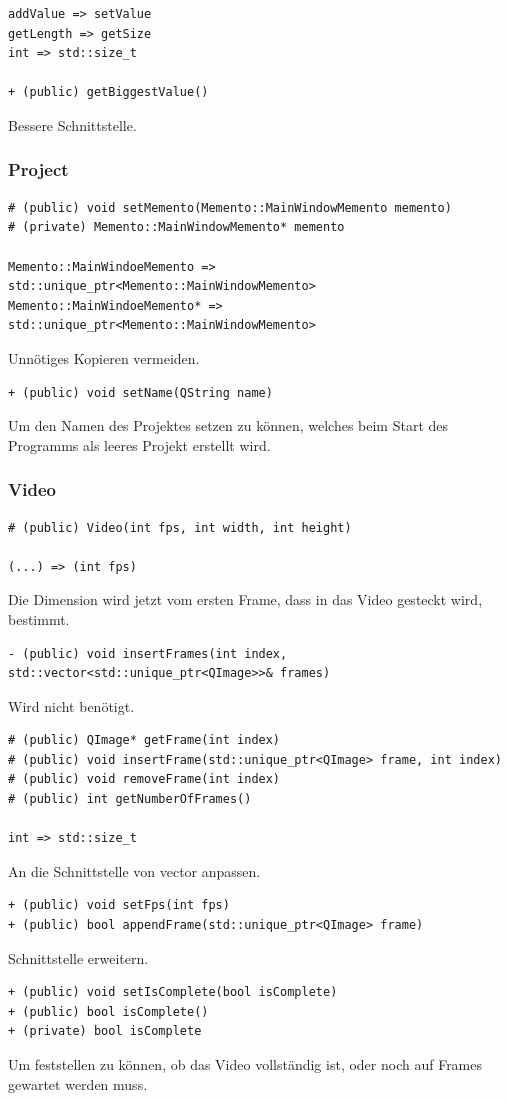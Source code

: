 \documentclass{scrartcl}
\begin{document}
{\begin{verbatim}
addValue => setValue
getLength => getSize
int => std::size_t

+ (public) getBiggestValue()
\end{verbatim}
Bessere Schnittstelle.
\newpage
\subsubsection{Project}
\bigskip
\begin{verbatim}
# (public) void setMemento(Memento::MainWindowMemento memento)
# (private) Memento::MainWindowMemento* memento

Memento::MainWindoeMemento => std::unique_ptr<Memento::MainWindowMemento>
Memento::MainWindoeMemento* => std::unique_ptr<Memento::MainWindowMemento>
\end{verbatim}
Unnötiges Kopieren vermeiden.
\bigskip
\begin{verbatim}
+ (public) void setName(QString name)
\end{verbatim}
Um den Namen des Projektes setzen zu können, welches beim Start des Programms als leeres Projekt erstellt wird.
\bigskip
\subsubsection{Video}
\bigskip
\begin{verbatim}
# (public) Video(int fps, int width, int height)

(...) => (int fps)
\end{verbatim}
Die Dimension wird jetzt vom ersten Frame, dass in das Video gesteckt wird, bestimmt.
\bigskip
\begin{verbatim}
- (public) void insertFrames(int index, std::vector<std::unique_ptr<QImage>>& frames)
\end{verbatim}
Wird nicht benötigt.
\bigskip
\begin{verbatim}
# (public) QImage* getFrame(int index)
# (public) void insertFrame(std::unique_ptr<QImage> frame, int index)
# (public) void removeFrame(int index)
# (public) int getNumberOfFrames()

int => std::size_t
\end{verbatim}
An die Schnittstelle von vector anpassen.
\bigskip
\begin{verbatim}
+ (public) void setFps(int fps)
+ (public) bool appendFrame(std::unique_ptr<QImage> frame)
\end{verbatim}
Schnittstelle erweitern.
\bigskip
\begin{verbatim}
+ (public) void setIsComplete(bool isComplete)
+ (public) bool isComplete()
+ (private) bool isComplete
\end{verbatim}
Um feststellen zu können, ob das Video vollständig ist, oder noch auf Frames gewartet werden muss.
\newpage
}
\end{document}
